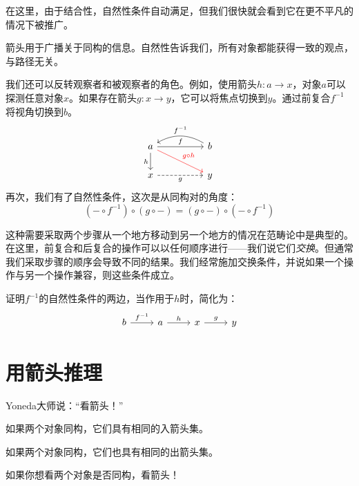 \documentclass[DaoFP]{subfiles}
\begin{document}
在这里，由于结合性，自然性条件自动满足，但我们很快就会看到它在更不平凡的情况下被推广。

箭头用于广播关于同构的信息。自然性告诉我们，所有对象都能获得一致的观点，与路径无关。

我们还可以反转观察者和被观察者的角色。例如，使用箭头$h \colon a \to x$，对象$a$可以探测任意对象$x$。如果存在箭头$g \colon x \to y$，它可以将焦点切换到$y$。通过前复合$f^{-1}$将视角切换到$b$。
\[
 \begin{tikzcd}
 a
 \arrow[rr, "f"]
 \arrow[d, "h"']
 \arrow[rrd, red, "g\circ h"]
 && b
  \arrow[ll, bend right,  "f^{-1}"']
 \\
 x
 \arrow[rr, dashed, "g"']
  && y
 \end{tikzcd}
\]
再次，我们有了自然性条件，这次是从同构对的角度：
\[(- \circ f^{-1}) \circ (g \circ -) = (g \circ -) \circ (- \circ f^{-1}) \]

这种需要采取两个步骤从一个地方移动到另一个地方的情况在范畴论中是典型的。在这里，前复合和后复合的操作可以以任何顺序进行——我们说它们\emph{交换}。但通常我们采取步骤的顺序会导致不同的结果。我们经常施加交换条件，并说如果一个操作与另一个操作兼容，则这些条件成立。

\begin{exercise}
证明$f^{-1}$的自然性条件的两边，当作用于$h$时，简化为：
\[
 \begin{tikzcd}
 b \arrow[r, "f^{-1}"] &a \arrow[r, "h"] & x \arrow[r, "g"] & y
\end{tikzcd}
\]

\end{exercise}

\section{用箭头推理}

Yoneda大师说：“看箭头！”

如果两个对象同构，它们具有相同的入箭头集。

如果两个对象同构，它们也具有相同的出箭头集。

如果你想看两个对象是否同构，看箭头！

\medskip
\end{document}
